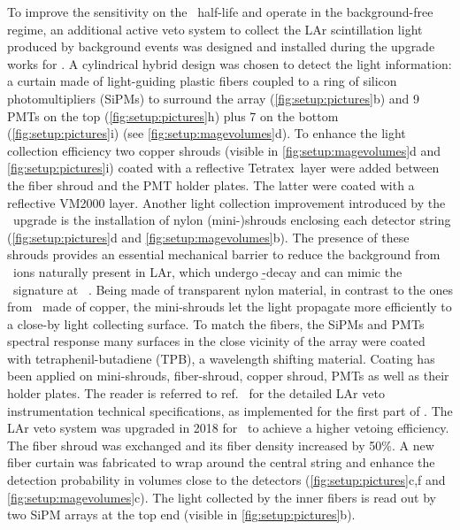 To improve the sensitivity on the \onbb\ half-life and operate in the background-free
regime, an additional active veto system to collect the LAr scintillation light produced
by background events was designed and installed during the upgrade works for \phasetwo. A
cylindrical hybrid design was chosen to detect the light information: a curtain made of
light-guiding plastic fibers coupled to a ring of silicon photomultipliers (SiPMs) to
surround the array (\cref{fig:setup:pictures}b) and 9 PMTs on the top
(\cref{fig:setup:pictures}h) plus 7 on the bottom (\cref{fig:setup:pictures}i) (see
\cref{fig:setup:magevolumes}d). To enhance the light collection efficiency two copper
shrouds (visible in \cref{fig:setup:magevolumes}d and \cref{fig:setup:pictures}i) coated
with a reflective Tetratex\reg\ layer were added between the fiber shroud and the PMT
holder plates. The latter were coated with a reflective VM2000 layer. Another light
collection improvement introduced by the \phasetwo\ upgrade is the installation of nylon
(mini-)shrouds enclosing each detector string (\cref{fig:setup:pictures}d and
\cref{fig:setup:magevolumes}b). The presence of these shrouds provides an essential
mechanical barrier to reduce the background from \kvz\ ions naturally present in LAr,
which undergo \b-decay and can mimic the \onbb\ signature at \qbb~\cite{Lubashevskiy2017}.
Being made of transparent nylon material, in contrast to the ones from \phaseone\ made of
copper, the mini-shrouds let the light propagate more efficiently to a close-by light
collecting surface. To match the fibers, the SiPMs and PMTs spectral response many
surfaces in the close vicinity of the array were coated with tetraphenil-butadiene (TPB),
a wavelength shifting material.  Coating has been applied on mini-shrouds, fiber-shroud,
copper shroud, PMTs as well as their holder plates. The reader is referred to
ref.~\cite{Agostini2018a} for the detailed LAr veto instrumentation technical
specifications, as implemented for the first part of \phasetwo.
\newpar
The LAr veto system was upgraded in 2018 for \phasetwop\ to achieve a higher vetoing
efficiency. The fiber shroud was exchanged and its fiber density increased by 50\%. A new
fiber curtain was fabricated to wrap around the central string and enhance the detection
probability in volumes close to the detectors (\cref{fig:setup:pictures}c,f and
\cref{fig:setup:magevolumes}c). The light collected by the inner fibers is read out by two
SiPM arrays at the top end (visible in \cref{fig:setup:pictures}b).

